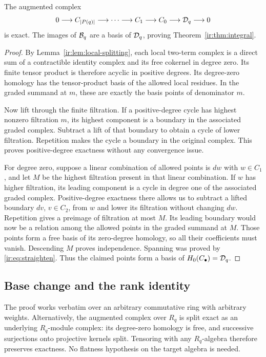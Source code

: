 \begin{theorem}\label{ir:thm:resolution}
The augmented complex
\[
 0\longrightarrow C_{|P(q)|}\longrightarrow\cdots
 \longrightarrow C_1\longrightarrow C_0\longrightarrow\mathcal D_q
 \longrightarrow0
\]
is exact. The images of $\mathcal B_q$ are a basis of $\mathcal D_q$, proving
Theorem~\ref{ir:thm:integral}.
\end{theorem}
\begin{proof}
By Lemma~\ref{ir:lem:local-splitting}, each local two-term complex is
a direct sum of a contractible identity complex and its free cokernel
in degree zero. Its finite tensor product is therefore acyclic in
positive degrees. Its degree-zero homology has the tensor-product
basis of the allowed local residues. In the graded summand at $m$,
these are exactly the basis points of denominator $m$.

Now lift through the finite filtration. If a positive-degree cycle
has highest nonzero filtration $m$, its highest component is a
boundary in the associated graded complex. Subtract a lift of that
boundary to obtain a cycle of lower filtration. Repetition makes the
cycle a boundary in the original complex. This proves positive-degree
exactness without any convergence issue.

For degree zero, suppose a linear combination of allowed points is
$d w$ with $w\in C_1$, and let $M$ be the highest filtration present
in that linear combination. If $w$ has higher filtration, its leading
component is a cycle in degree one of the associated graded complex.
Positive-degree exactness there allows us to subtract a lifted boundary
$d v$, $v\in C_2$, from $w$ and lower its filtration without changing
$d w$. Repetition gives a preimage of filtration at most $M$. Its
leading boundary would now be a relation among the allowed points in
the graded summand at $M$. Those points form a free basis of its
zero-degree homology, so all their coefficients must vanish. Descending
$M$ proves independence. Spanning was proved by
\eqref{ir:eq:straighten}. Thus the claimed points form a basis of
$H_0(C_\bullet)=\mathcal D_q$.
\end{proof}

\subsection{Base change and the rank identity}
The proof works verbatim over an arbitrary commutative ring with
arbitrary weights. Alternatively, the augmented complex over $R_q$
is split exact as an underlying $R_q$-module complex: its degree-zero
homology is free, and successive surjections onto projective kernels
split. Tensoring with any $R_q$-algebra therefore preserves exactness.
No flatness hypothesis on the target algebra is needed.

